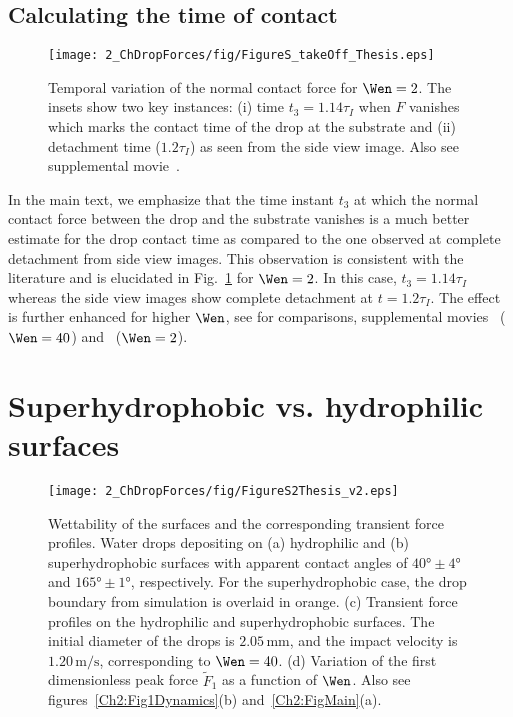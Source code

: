 \begin{subappendices}
	\subsection{Calculating the time of contact}
	
		\begin{figure}
		\centering
		\texttt{[image: 2\_ChDropForces/fig/FigureS\_takeOff\_Thesis.eps]}
		\caption{Temporal variation of the normal contact force for $\Wen = 2$. The insets show two key instances: (i) time $t_3 = 1.14\tau_I$ when $F$ vanishes which marks the contact time of the drop at the substrate and (ii) detachment time ($1.2\tau_I$) as seen from the side view image. Also see supplemental movie~.}
		\label{Fig_TakeOff}
	\end{figure}
	
	In the main text, we emphasize that the time instant $t_3$ at which the normal contact force between the drop and the substrate vanishes is a much better estimate for the drop contact time as compared to the one observed at complete detachment from side view images. This observation is consistent with the literature \cite{bouwhuis2012, van2012direct, lee2020drop,  chantelot_lohse_2021} and is elucidated in Fig.~\ref{Fig_TakeOff} for $\Wen = 2$. In this case, $t_3 = 1.14\tau_I$ whereas the side view images show complete detachment at $t = 1.2\tau_I$. The effect is further enhanced for higher $\Wen$, see for comparisons, supplemental movies~ ($\Wen = 40$) and~ ($\Wen = 2$).
	
	\section{Superhydrophobic vs. hydrophilic surfaces}\label{Ch2:SecPhobicPhilic}
	
	\begin{figure}
		\texttt{[image: 2\_ChDropForces/fig/FigureS2Thesis\_v2.eps]}
		\caption{Wettability of the surfaces and the corresponding transient force profiles. Water drops depositing on (a) hydrophilic and (b) superhydrophobic surfaces with apparent contact angles of $40\si{\degree} \pm 4\si{\degree}$ and $165\si{\degree} \pm 1\si{\degree}$, respectively. For the superhydrophobic case, the drop boundary from simulation is overlaid in orange. (c) Transient force profiles on the hydrophilic and superhydrophobic surfaces. The initial diameter of the drops is $2.05\,\si{\milli\meter}$, and the impact velocity is $1.20\,\si{\meter}/\si{\second}$, corresponding to $\Wen = 40$. (d) Variation of the first dimensionless peak force $\tilde{F}_1$ as a function of $\Wen$.  Also see figures~\ref{Ch2:Fig1Dynamics}(b) and~\ref{Ch2:FigMain}(a).}
		\label{Ch2:Fig_phobicphilic}
	\end{figure}
	

\end{subappendices}
